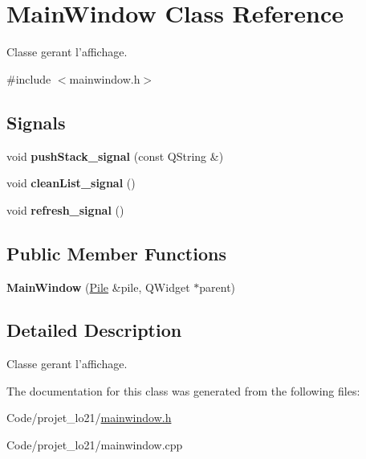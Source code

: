 \hypertarget{class_main_window}{\section{Main\-Window Class Reference}
\label{class_main_window}
}


Classe gerant l'affichage.  




{\ttfamily \#include $<$mainwindow.\-h$>$}

\subsection*{Signals}
\begin{DoxyCompactItemize}
\item 
\hypertarget{class_main_window_a1e39eccc1e017799bda6b446b8280edf}{void {\bfseries push\-Stack\-\_\-signal} (const Q\-String \&)}\label{class_main_window_a1e39eccc1e017799bda6b446b8280edf}

\item 
\hypertarget{class_main_window_aed37073752de791b6ad06e41a8e9f1b2}{void {\bfseries clean\-List\-\_\-signal} ()}\label{class_main_window_aed37073752de791b6ad06e41a8e9f1b2}

\item 
\hypertarget{class_main_window_a94d40675237489fc9d25ccc868a4dcbd}{void {\bfseries refresh\-\_\-signal} ()}\label{class_main_window_a94d40675237489fc9d25ccc868a4dcbd}

\end{DoxyCompactItemize}
\subsection*{Public Member Functions}
\begin{DoxyCompactItemize}
\item 
\hypertarget{class_main_window_ac8603055e732d11c01cfa8e44bff3ca2}{{\bfseries Main\-Window} (\hyperlink{class_pile}{Pile} \&pile, Q\-Widget $\ast$parent)}\label{class_main_window_ac8603055e732d11c01cfa8e44bff3ca2}

\end{DoxyCompactItemize}


\subsection{Detailed Description}
Classe gerant l'affichage. 

The documentation for this class was generated from the following files\-:\begin{DoxyCompactItemize}
\item 
Code/projet\-\_\-lo21/\hyperlink{mainwindow_8h}{mainwindow.\-h}\item 
Code/projet\-\_\-lo21/mainwindow.\-cpp\end{DoxyCompactItemize}
